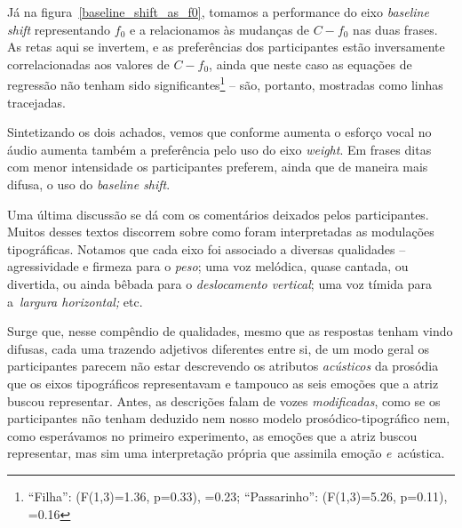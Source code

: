 \documentclass[a4paper]{tufte-handout}
\newcommand{\textls}[2][5]{%
    \begingroup\addfontfeatures{LetterSpace=#1}#2\endgroup
  }
\renewcommand{\smallcapsspacing}[1]{\textls[10]{#1}}
\renewcommand{\textsc}[1]{\smallcapsspacing{\textsmallcaps{#1}}}
\begin{document}
Já na figura~\ref{baseline_shift_as_f0}, tomamos a performance do eixo \textit{baseline shift} representando $f_0$ e a relacionamos às mudanças de $C - f_0$ nas duas frases. As retas aqui se invertem, e as preferências dos participantes estão inversamente correlacionadas aos valores de $C-f_0$, ainda que neste caso as equações de regressão não tenham sido significantes\footnote{``Filha'': (F(1,3)=1.36, p=0.33), \textsc{rse}=0.23; ``Passarinho'': (F(1,3)=5.26, p=0.11), \textsc{rse}=0.16} -- são, portanto, mostradas como linhas tracejadas.

Sintetizando os dois achados, vemos que conforme aumenta o esforço vocal no áudio aumenta também a preferência pelo uso do eixo \textit{weight}. Em frases ditas com menor intensidade os participantes preferem, ainda que de maneira mais difusa, o uso do \textit{baseline shift}.

Uma última discussão se dá com os comentários deixados pelos participantes. Muitos desses textos discorrem sobre como foram interpretadas as modulações tipográficas. Notamos que cada eixo foi associado a diversas qualidades -- agressividade e firmeza para o \textit{peso}; uma voz melódica, quase cantada, ou divertida, ou ainda bêbada para o \textit{deslocamento vertical}; uma voz tímida para a~\textit{largura horizontal;} etc. 

Surge que, nesse compêndio de qualidades, mesmo que as respostas tenham vindo difusas, cada uma trazendo adjetivos diferentes entre si, de um modo geral os participantes parecem não estar descrevendo os atributos \textit{acústicos} da prosódia que os eixos tipográficos representavam e tampouco as seis emoções que a atriz buscou representar. Antes, as descrições falam de vozes \textit{modificadas}, como se os participantes não tenham deduzido nem nosso modelo prosódico-tipográfico nem, como esperávamos no primeiro experimento, as emoções que a atriz buscou representar, mas sim uma interpretação própria que assimila emoção \textit{e}~acústica.
\end{document}

